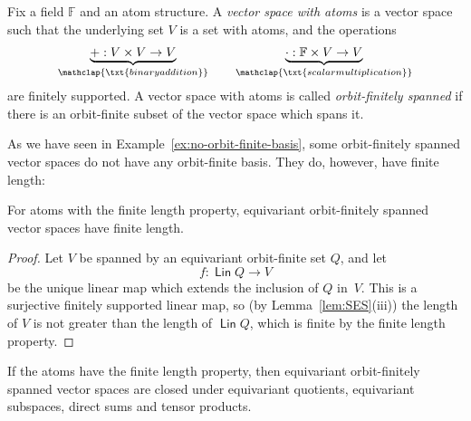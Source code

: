 \documentclass[10pt,a4paper]{amsart}
\numberwithin{equation}{section}
\newcommand{\myunderbrace}[2]{\underbrace{#1}_{\mathclap{\txt{\scriptsize #2}}}}
\DeclareMathOperator{\lin}{\mathsf{Lin}}
\newcommand{\field}{\mathbb F}
\begin{document}
\begin{definition} Fix a field $\field$ and an atom structure.
    A \emph{vector space with atoms} is a vector space  such that the underlying set $V$ is a set with atoms, and the operations
    \begin{align*}
    \myunderbrace{+ : V \times V \to V}{binary addition} \qquad 
    \myunderbrace{\cdot : \field \times V \to V}{scalar multiplication}
    \end{align*}
    are finitely supported.  A vector space with atoms is called \emph{orbit-finitely spanned} if there is an orbit-finite subset of the vector space which spans it.
\end{definition}

As we have seen in Example~\ref{ex:no-orbit-finite-basis}, some orbit-finitely spanned vector spaces do not have any orbit-finite basis.
They do, however, have finite length:

\begin{lemma}\label{lem:finite-length-for-ofs}
For atoms with the finite length property,  equivariant orbit-finitely spanned vector spaces have finite length.
\end{lemma}
\begin{proof}
Let $V$ be spanned by an equivariant orbit-finite set $Q$, and let
\[ f \colon \lin Q \to V \]
be the unique linear map which extends the inclusion of $Q$ in~$V$.
This is a surjective finitely supported linear map, so (by Lemma~\ref{lem:SES}(iii)) the length of $V$ is not greater than the length of $\lin Q$, which is finite by the finite length property.
\end{proof}



\begin{theorem}\label{thm:orbit-finitely-spanned-closure}
If the atoms have the finite length property, then
equivariant orbit-finitely spanned vector spaces  are closed under equivariant quotients, equivariant subspaces, direct sums and tensor products.
\end{theorem}
\end{document}

